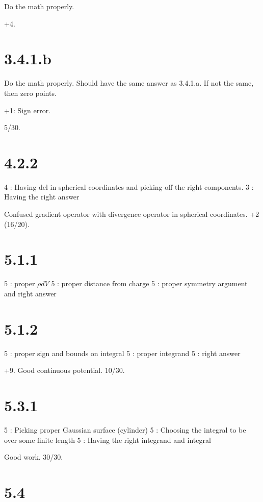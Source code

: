 \documentclass{article}
\begin{document}
Do the math properly.

+4.

\section*{3.4.1.b}
\label{sec:3_4_1_b}

Do the math properly. Should have the same answer as 3.4.1.a. If not the same,
then zero points.

+1: Sign error.

5/30.

\section*{4.2.2}
\label{sec:4_2_2}

4 : Having del in spherical coordinates and picking off the right components.
3 : Having the right answer

Confused gradient operator with divergence operator in spherical coordinates. +2
(16/20).

\section*{5.1.1}
\label{sec:5_1_1}

5 : proper $ \rho dV $
5 : proper distance from charge
5 : proper symmetry argument and right answer

\section*{5.1.2}
\label{sec:5_1_2}

5 : proper sign and bounds on integral
5 : proper integrand
5 : right answer

+9. Good continuous potential. 10/30.

\section*{5.3.1}
\label{sec:5_3_1}

5 : Picking proper Gaussian surface (cylinder)
5 : Choosing the integral to be over some finite length
5 : Having the right integrand and integral

Good work. 30/30.

\section*{5.4}
\label{sec:5_4}
\end{document}
